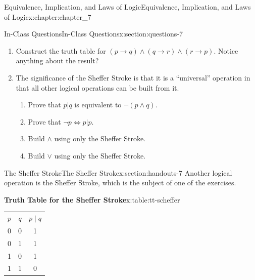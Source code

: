 \documentclass[oneside,10pt,]{book}
\newcommand{\tabularfont}{\relax}
\numberwithin{equation}{section}
\begin{document}
\begin{chapterptx}{Equivalence, Implication, and Laws of Logic}{}{Equivalence, Implication, and Laws of Logic}{}{}{x:chapter:chapter_7}
\begin{sectionptx}{In-Class Questions}{}{In-Class Questions}{}{}{x:section:questions-7}
\begin{enumerate}[label=\arabic*.]
\item{}Construct the truth table for \((p \rightarrow q) \land (q \rightarrow r) \land (r \rightarrow p)\).   Notice anything about the result?%
\item{}The significance of the Sheffer Stroke is that it is a ``universal'' operation in that all other logical operations can be built from it.%
\begin{enumerate}[label=(\alph*)]
\item{}Prove that \(p | q\) is equivalent to \(\neg (p \land  q)\).%
\item{}Prove that \(\neg p \Leftrightarrow  p | p\).%
\item{}Build \(\land\) using only the Sheffer Stroke.%
\item{}Build \(\lor\) using only the Sheffer Stroke.%
\end{enumerate}
%
\end{enumerate}
%
\end{sectionptx}
%
%
\typeout{************************************************}
\typeout{************************************************}
%
\begin{sectionptx}{The Sheffer Stroke}{}{The Sheffer Stroke}{}{}{x:section:handouts-7}
%
Another logical operation is the Sheffer Stroke, which is the subject of one of the exercises.%
\begin{tableptx}{\textbf{Truth Table for the Sheffer Stroke}}{x:table:tt-scheffer}{}%
\centering
{\tabularfont%
\begin{tabular}{ccc}
\(p\)&\(q\)&\(p \mid q\)\tabularnewline[0pt]
0&0&1\tabularnewline[0pt]
0&1&1\tabularnewline[0pt]
1&0&1\tabularnewline[0pt]
1&1&0
\end{tabular}
}%
\end{tableptx}%
\end{sectionptx}
\end{chapterptx}
%
%
\typeout{************************************************}
\typeout{************************************************}
%
\end{document}
